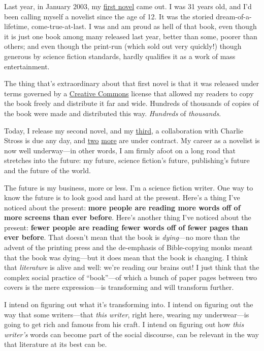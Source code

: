 Last year, in January 2003, my
\href{http://craphound.com/down}{first novel} came out. I was 31
years old, and I’d been calling myself a novelist since the age of
12. It was the storied dream-of-a-lifetime, come-true-at-last. I
was and am proud as hell of that book, even though it is just one
book among many released last year, better than some, poorer than
others; and even though the print-run (which sold out very
quickly!) though generous by science fiction standards, hardly
qualifies it as a work of mass entertainment.

The thing that’s extraordinary about that first novel is that it
was released under terms governed by a
\href{http://creativecommons.org/}{Creative Commons} license that
allowed my readers to copy the book freely and distribute it far
and wide. Hundreds of thousands of copies of the book were made and
distributed this way. \emph{Hundreds} of \emph{thousands}.

Today, I release my second novel, and my
\href{http://www.argosymag.com/NextIssue.html}{third}, a
collaboration with Charlie Stross is due any day, and
\href{http://www.fantasticmetropolis.com/show.html?fn.preview_doctorow}{two}
\href{http://www.craphound.com/usrbingodexcerpt.txt}{more} are
under contract. My career as a novelist is now well underway—in
other words, I am firmly afoot on a long road that stretches into
the future: my future, science fiction’s future, publishing’s
future and the future of the world.

The future is my business, more or less. I’m a science fiction
writer. One way to know the future is to look good and hard at the
present. Here’s a thing I’ve noticed about the present:
\textbf{more people are reading more words off of more screens than ever before}.
Here’s another thing I’ve noticed about the present:
\textbf{fewer people are reading fewer words off of fewer pages than ever before}.
That doesn’t mean that the book is \emph{dying}—no more than the
advent of the printing press and the de-emphasis of Bible-copying
monks meant that the book was dying—but it does mean that the book
is changing. I think that \emph{literature} is alive and well:
we’re reading our brains out! I just think that the complex social
practice of “book”—of which a bunch of paper pages between two
covers is the mere expression—is transforming and will transform
further.

I intend on figuring out what it’s transforming into. I intend on
figuring out the way that some writers—that \emph{this writer},
right here, wearing my underwear—is going to get rich and famous
from his craft. I intend on figuring out how \emph{this writer’s}
words can become part of the social discourse, can be relevant in
the way that literature at its best can be.

